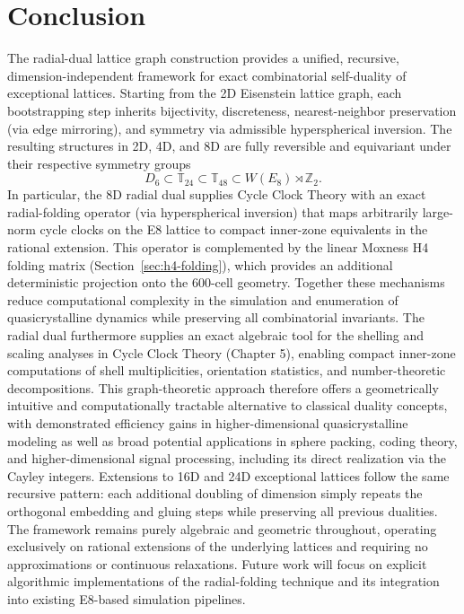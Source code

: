 \documentclass{article}
\begin{document}
\section{Conclusion}
The radial-dual lattice graph construction provides a unified, recursive, dimension-independent framework for exact combinatorial self-duality of exceptional lattices. Starting from the 2D Eisenstein lattice graph, each bootstrapping step inherits bijectivity, discreteness, nearest-neighbor preservation (via edge mirroring), and symmetry via admissible hyperspherical inversion. The resulting structures in 2D, 4D, and 8D are fully reversible and equivariant under their respective symmetry groups
\[
D_6 \subset \mathbb{T}_{24} \subset \mathbb{T}_{48} \subset W(E_8) \rtimes \mathbb{Z}_2.
\]
In particular, the 8D radial dual supplies Cycle Clock Theory with an exact radial-folding operator (via hyperspherical inversion) that maps arbitrarily large-norm cycle clocks on the E8 lattice to compact inner-zone equivalents in the rational extension. This operator is complemented by the linear Moxness H4 folding matrix (Section~\ref{sec:h4-folding}), which provides an additional deterministic projection onto the 600-cell geometry. Together these mechanisms reduce computational complexity in the simulation and enumeration of quasicrystalline dynamics while preserving all combinatorial invariants. The radial dual furthermore supplies an exact algebraic tool for the shelling and scaling analyses in Cycle Clock Theory (Chapter 5), enabling compact inner-zone computations of shell multiplicities, orientation statistics, and number-theoretic decompositions. This graph-theoretic approach therefore offers a geometrically intuitive and computationally tractable alternative to classical duality concepts, with demonstrated efficiency gains in higher-dimensional quasicrystalline modeling as well as broad potential applications in sphere packing, coding theory, and higher-dimensional signal processing, including its direct realization via the Cayley integers. Extensions to 16D and 24D exceptional lattices follow the same recursive pattern: each additional doubling of dimension simply repeats the orthogonal embedding and gluing steps while preserving all previous dualities.
The framework remains purely algebraic and geometric throughout, operating exclusively on rational extensions of the underlying lattices and requiring no approximations or continuous relaxations. Future work will focus on explicit algorithmic implementations of the radial-folding technique and its integration into existing E8-based simulation pipelines.
\end{document}
